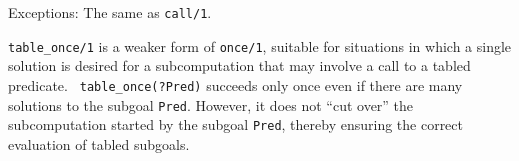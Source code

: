\begin{description}
    Exceptions: The same as {\tt call/1}.


{\tt table\_once/1} is a weaker form of {\tt once/1}, suitable for
situations in which a single solution is desired for a subcomputation
that may involve a call to a tabled predicate.  {\tt
table\_once(?Pred)} succeeds only once even if there are many
solutions to the subgoal {\tt Pred}.  However, it does not ``cut
over'' the subcomputation started by the subgoal {\tt Pred}, thereby
ensuring the correct evaluation of tabled subgoals.

\end{description}


